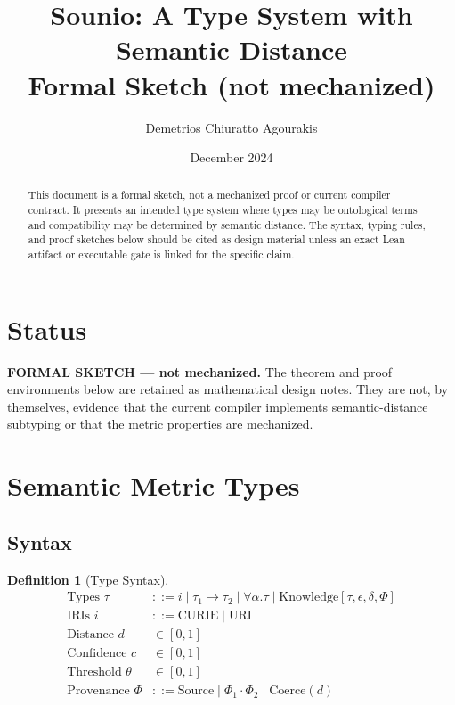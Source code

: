 \documentclass{article}
\title{Sounio: A Type System with Semantic Distance\\
\large Formal Sketch (not mechanized)}
\author{Demetrios Chiuratto Agourakis}
\date{December 2024}
\newtheorem{definition}[theorem]{Definition}
\begin{document}
\maketitle

\begin{abstract}
This document is a formal sketch, not a mechanized proof or current compiler
contract. It presents an intended type system where types may be ontological
terms and compatibility may be determined by semantic distance. The syntax,
typing rules, and proof sketches below should be cited as design material
unless an exact Lean artifact or executable gate is linked for the specific
claim.
\end{abstract}

\section*{Status}

\textbf{FORMAL SKETCH --- not mechanized.} The theorem and proof environments
below are retained as mathematical design notes. They are not, by themselves,
evidence that the current compiler implements semantic-distance subtyping or
that the metric properties are mechanized.

\section{Semantic Metric Types}

\subsection{Syntax}

\begin{definition}[Type Syntax]
\begin{align*}
\text{Types } \tau &::= i \mid \tau_1 \to \tau_2 \mid \forall \alpha. \tau \mid \text{Knowledge}[\tau, \epsilon, \delta, \Phi] \\
\text{IRIs } i &::= \text{CURIE} \mid \text{URI} \\
\text{Distance } d &\in [0, 1] \\
\text{Confidence } c &\in [0, 1] \\
\text{Threshold } \theta &\in [0, 1] \\
\text{Provenance } \Phi &::= \text{Source} \mid \Phi_1 \cdot \Phi_2 \mid \text{Coerce}(d)
\end{align*}
\end{definition}
\end{document}
